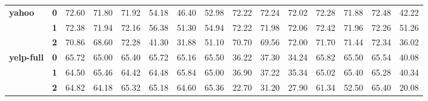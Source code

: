 \begin{table*}
\begin{tabular}{lllllllllllllll}
		\hline
		\multirow{3}{*}{\textbf{yahoo}}     & \textbf{0} & 72.60                          & 71.80                          & 71.92                          & 54.18                          & 46.40                          & 52.98                          & 72.22                          & 72.24                          & 72.02                          & 72.28                          & 71.88                          & 72.48                          & 42.22                              \\
		& \textbf{1} & 72.38                          & 71.94                          & 72.16                          & 56.38                          & 51.30                          & 54.94                          & 72.22                          & 71.98                          & 72.06                          & 72.42                          & 71.96                          & 72.26                          & 51.26                              \\
		& \textbf{2} & 70.86                          & 68.60                          & 72.28                          & 41.30                          & 31.88                          & 51.10                          & 70.70                          & 69.56                          & 72.00                          & 71.70                          & 71.44                          & 72.34                          & 36.02                              \\
		\hline
		\multirow{3}{*}{\textbf{yelp-full}} & \textbf{0} & 65.72                          & 65.00                          & 65.40                          & 65.72                          & 65.16                          & 65.50                          & 36.22                          & 37.30                          & 34.24                          & 65.82                          & 65.50                          & 65.54                          & 40.08                              \\
		& \textbf{1} & 64.50                          & 65.46                          & 64.42                          & 64.48                          & 65.84                          & 65.00                          & 36.90                          & 37.22                          & 35.34                          & 65.02                          & 65.40                          & 65.28                          & 40.34                              \\
		& \textbf{2} & 64.82                          & 64.18                          & 65.32                          & 65.18                          & 64.60                          & 65.36                          & 22.70                          & 31.20                          & 27.90                          & 61.34                          & 52.50                          & 65.40                          & 20.08                              \\

\end{tabular}
\end{table*}
